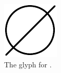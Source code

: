 \begin{figure}[H]
  \centering
  \includegraphics{images/build/empty_set.pdf}
  \caption{The \PD glyph for .}
  \label{fig:emptySet}
\end{figure}

